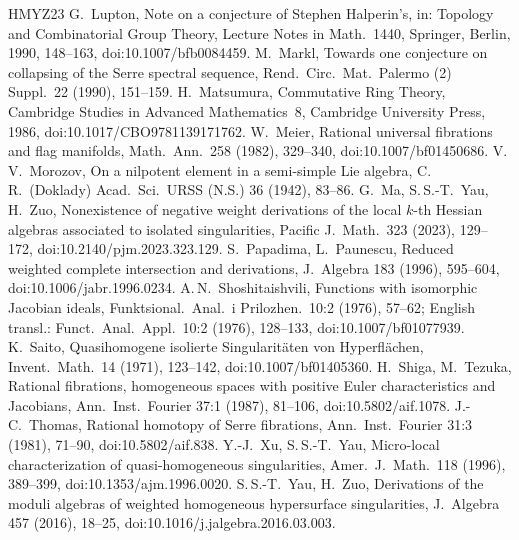 \documentclass[11pt]{article}
\theoremstyle{remark}
\begin{document}
{\begin{thebibliography}{HMYZ23}
 G.~Lupton, Note on a conjecture of Stephen Halperin's, in: Topology and Combinatorial Group Theory, Lecture Notes in Math.\ 1440, Springer, Berlin, 1990, 148--163, doi:10.1007/bfb0084459.
 M.~Markl, Towards one conjecture on collapsing of the Serre spectral sequence, Rend.\ Circ.\ Mat.\ Palermo (2) Suppl.\ 22 (1990), 151--159.
 H.~Matsumura, Commutative Ring Theory, Cambridge Studies in Advanced Mathematics~8, Cambridge University Press, 1986, doi:10.1017/CBO9781139171762.
 W.~Meier, Rational universal fibrations and flag manifolds, Math.\ Ann.\ 258 (1982), 329--340, doi:10.1007/bf01450686.
 V.\,V.~Morozov, On a nilpotent element in a semi-simple Lie algebra, C.\,R.\ (Doklady) Acad.\ Sci.\ URSS (N.S.) 36 (1942), 83--86.
 G.~Ma, S.\,S.-T.~Yau, H.~Zuo, Nonexistence of negative weight derivations of the local $k$-th Hessian algebras associated to isolated singularities, Pacific J.\ Math.\ 323 (2023), 129--172, doi:10.2140/pjm.2023.323.129.
 S.~Papadima, L.~Paunescu, Reduced weighted complete intersection and derivations, J.\ Algebra 183 (1996), 595--604, doi:10.1006/jabr.1996.0234.
 A.\,N.~Shoshitaishvili, Functions with isomorphic Jacobian ideals, Funktsional.\ Anal.\ i Prilozhen.\ 10:2 (1976), 57--62; English transl.: Funct.\ Anal.\ Appl.\ 10:2 (1976), 128--133, doi:10.1007/bf01077939.
 K.~Saito, Quasihomogene isolierte Singularit\"aten von Hyperfl\"achen, Invent.\ Math.\ 14 (1971), 123--142, doi:10.1007/bf01405360.
 H.~Shiga, M.~Tezuka, Rational fibrations, homogeneous spaces with positive Euler characteristics and Jacobians, Ann.\ Inst.\ Fourier 37:1 (1987), 81--106, doi:10.5802/aif.1078.
 J.-C.~Thomas, Rational homotopy of Serre fibrations, Ann.\ Inst.\ Fourier 31:3 (1981), 71--90, doi:10.5802/aif.838.
 Y.-J.~Xu, S.\,S.-T.~Yau, Micro-local characterization of quasi-homogeneous singularities, Amer.\ J.\ Math.\ 118 (1996), 389--399, doi:10.1353/ajm.1996.0020.
 S.\,S.-T.~Yau, H.~Zuo, Derivations of the moduli algebras of weighted homogeneous hypersurface singularities, J.\ Algebra 457 (2016), 18--25, doi:10.1016/j.jalgebra.2016.03.003.
\end{thebibliography}
}
\end{document}
